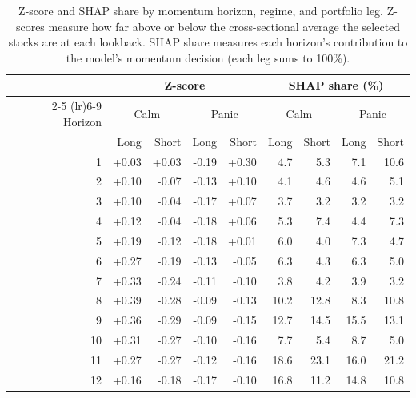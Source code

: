 \begin{table}[H]
\centering
\small
\begin{tabular}{r rr rr rr rr}
\toprule
 & \multicolumn{4}{c}{Z-score} & \multicolumn{4}{c}{SHAP share (\%)} \\
\cmidrule(lr){2-5} \cmidrule(lr){6-9}
Horizon & \multicolumn{2}{c}{Calm} & \multicolumn{2}{c}{Panic} & \multicolumn{2}{c}{Calm} & \multicolumn{2}{c}{Panic} \\
 & Long & Short & Long & Short & Long & Short & Long & Short \\
\midrule
1 & +0.03 & +0.03 & -0.19 & +0.30 & 4.7 & 5.3 & 7.1 & 10.6 \\
2 & +0.10 & -0.07 & -0.13 & +0.10 & 4.1 & 4.6 & 4.6 & 5.1 \\
3 & +0.10 & -0.04 & -0.17 & +0.07 & 3.7 & 3.2 & 3.2 & 3.2 \\
4 & +0.12 & -0.04 & -0.18 & +0.06 & 5.3 & 7.4 & 4.4 & 7.3 \\
5 & +0.19 & -0.12 & -0.18 & +0.01 & 6.0 & 4.0 & 7.3 & 4.7 \\
6 & +0.27 & -0.19 & -0.13 & -0.05 & 6.3 & 4.3 & 6.3 & 5.0 \\
7 & +0.33 & -0.24 & -0.11 & -0.10 & 3.8 & 4.2 & 3.9 & 3.2 \\
8 & +0.39 & -0.28 & -0.09 & -0.13 & 10.2 & 12.8 & 8.3 & 10.8 \\
9 & +0.36 & -0.29 & -0.09 & -0.15 & 12.7 & 14.5 & 15.5 & 13.1 \\
10 & +0.31 & -0.27 & -0.10 & -0.16 & 7.7 & 5.4 & 8.7 & 5.0 \\
11 & +0.27 & -0.27 & -0.12 & -0.16 & 18.6 & 23.1 & 16.0 & 21.2 \\
12 & +0.16 & -0.18 & -0.17 & -0.10 & 16.8 & 11.2 & 14.8 & 10.8 \\
\bottomrule
\end{tabular}
\caption{Z-score and SHAP share by momentum horizon, regime, and portfolio leg. Z-scores measure how far above or below the cross-sectional average the selected stocks are at each lookback. SHAP share measures each horizon's contribution to the model's momentum decision (each leg sums to 100\%).}
\label{tab:zscore_shap_detail}
\end{table}
